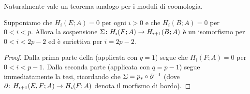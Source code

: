 Naturalmente vale un teorema analogo per i moduli di coomologia.
\begin{corollary}
Supponiamo che $H_i(E;A)=0$ per ogni $i>0$ e che $H_i(B;A)=0$ per $0<i<p$. Allora la sospensione $\Sigma\colon H_i(F;A)\to H_{i+1}(B;A)$ è un isomorfismo per $0<i<2p-2$ ed è suriettiva per $i=2p-2$.
\end{corollary}
\begin{proof}
Dalla prima parte della  (applicata con $q=1$) segue che $H_i(F;A)=0$ per $0<i<p-1$. Dalla seconda parte (applicata con $q=p-1$) segue immediatamente la tesi, ricordando che $\Sigma=p_\ast\circ\partial^{-1}$ (dove $\partial\colon H_{i+1}(E,F;A)\to H_i(F;A)$ denota il morfismo di bordo).
\end{proof}